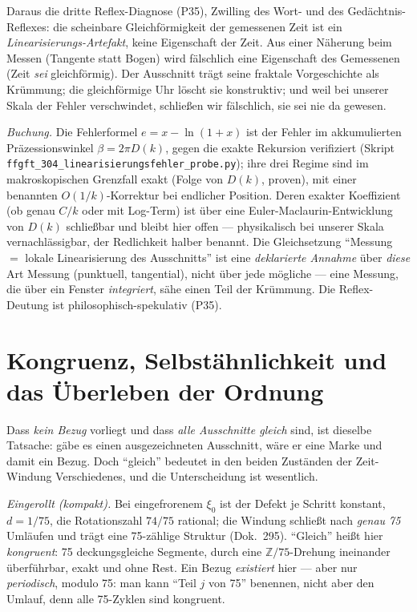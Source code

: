 Daraus die dritte Reflex-Diagnose (P35), Zwilling des Wort- und des Gedächtnis-Reflexes:
die scheinbare Gleichförmigkeit der gemessenen Zeit ist ein \emph{Linearisierungs-Artefakt},
keine Eigenschaft der Zeit. Aus einer Näherung beim Messen (Tangente statt Bogen) wird
fälschlich eine Eigenschaft des Gemessenen (Zeit \emph{sei} gleichförmig). Der Ausschnitt
trägt seine fraktale Vorgeschichte als Krümmung; die gleichförmige Uhr löscht sie
konstruktiv; und weil bei unserer Skala der Fehler verschwindet, schließen wir fälschlich,
sie sei nie da gewesen.

\emph{Buchung.} Die Fehlerformel $e = x-\ln(1+x)$ ist der Fehler im akkumulierten
Präzessionswinkel $\beta=2\pi D(k)$, gegen die exakte Rekursion verifiziert
(Skript \texttt{ffgft\_304\_linearisierungsfehler\_probe.py}); ihre drei
Regime sind im makroskopischen Grenzfall exakt (Folge von $D(k)$, proven), mit einer
benannten $O(1/k)$-Korrektur bei endlicher Position. Deren exakter Koeffizient (ob genau
$C/k$ oder mit Log-Term) ist über eine Euler-Maclaurin-Entwicklung von $D(k)$ schließbar und
bleibt hier offen --- physikalisch bei unserer Skala vernachlässigbar, der Redlichkeit halber
benannt. Die Gleichsetzung \enquote{Messung $=$ lokale Linearisierung des Ausschnitts} ist
eine \emph{deklarierte Annahme} über \emph{diese} Art Messung (punktuell, tangential), nicht
über jede mögliche --- eine Messung, die über ein Fenster \emph{integriert}, sähe einen Teil
der Krümmung. Die Reflex-Deutung ist philosophisch-spekulativ (P35).

\section{Kongruenz, Selbstähnlichkeit und das Überleben der Ordnung}

Dass \emph{kein Bezug} vorliegt und dass \emph{alle Ausschnitte gleich} sind, ist dieselbe
Tatsache: gäbe es einen ausgezeichneten Ausschnitt, wäre er eine Marke und damit ein Bezug.
Doch \enquote{gleich} bedeutet in den beiden Zuständen der Zeit-Windung Verschiedenes, und
die Unterscheidung ist wesentlich.

\emph{Eingerollt (kompakt).} Bei eingefrorenem $\xi_0$ ist der Defekt je Schritt konstant,
$d=1/75$, die Rotationszahl $74/75$ rational; die Windung schließt nach \emph{genau 75}
Umläufen und trägt eine 75-zählige Struktur (Dok.~295). \enquote{Gleich} heißt hier
\emph{kongruent}: 75 deckungsgleiche Segmente, durch eine $\mathbb{Z}/75$-Drehung ineinander
überführbar, exakt und ohne Rest. Ein Bezug \emph{existiert} hier --- aber nur
\emph{periodisch}, modulo 75: man kann \enquote{Teil $j$ von 75} benennen, nicht aber den
Umlauf, denn alle 75-Zyklen sind kongruent.

